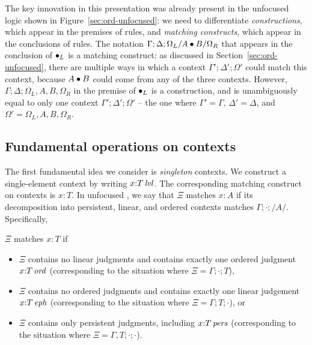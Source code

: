 
The key innovation in this presentation was already present in the
unfocused logic shown in Figure~\ref{sec:ord-unfocused}: we need to
differentiate {\it constructions}, which appear in the premises of
rules, and {\it matching constructs}, which appear in the conclusions
of rules.  The notation $\Gamma; \Delta; \Omega_L/A\mathbin{\bullet} B/\Omega_R$
that appears in the conclusion of ${\mathbin{\bullet}}_L$ is a matching construct;
as discussed in Section~\ref{sec:ord-unfocused}, there are multiple
ways in which a context $\Gamma'; \Delta'; \Omega'$ could match this
context, because $A \mathbin{\bullet} B$ could come from any of the three
contexts. However, $\Gamma; \Delta; \Omega_L,{A},{B}, \Omega_R$ in the
premise of ${\mathbin{\bullet}}_L$ is a construction, and is unambiguously equal
to only one context $\Gamma'; \Delta'; \Omega'$ -- the one where
$\Gamma' = \Gamma$, $\Delta' = \Delta$, and 
$\Omega' = \Omega_L, {A}, {B}, \Omega_R$.

\subsection{Fundamental operations on contexts}

The first fundamental idea we consider is {\it singleton} contexts.
We construct a single-element context by writing $x{:}{T}\,{{\it lvl}}$.
The corresponding matching construct on contexts is 
$x{:}{T}$. In unfocused \ollll, we say that $\Xi$ matches 
$x{:}{A}$ if its decomposition into persistent, linear, and 
ordered contexts matches $\Gamma; \cdot; /A/$. Specifically,

\bigskip
\begin{definition}
  $\Xi$ matches $x{:}T$ if
\begin{itemize}
\item $\Xi$ contains no linear judgments and contains exactly
one
ordered judgment $x{:}{T}\,{{\it ord}}$ (corresponding to the situation where
$\Xi = \Gamma; \cdot; T$), 
\item $\Xi$ contains no ordered judgments and contains exactly
one linear judgement $x{:}{T}\,{{\it eph}}$ (corresponding to the situation where
$\Xi = \Gamma; T; \cdot$), or 
\item $\Xi$ contains only persistent judgments, including
$x{:}{T}\,{{\it pers}}$ (corresponding to the situation where
$\Xi = \Gamma, T; \cdot; \cdot$). 
\end{itemize}
\end{definition}
\bigskip


